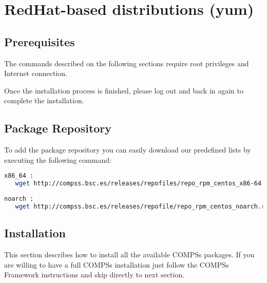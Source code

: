 \section{RedHat-based distributions (yum)}
\label{sec:RedHat_yum}


\subsection{Prerequisites}
The commands described on the following sections require root privileges and Internet connection.

Once the installation process is finished, please log out and back in again to complete the installation. 

\subsection{Package Repository}
To add the package repository you can easily download our predefined lists by executing the following command:
\begin{lstlisting}[language=bash]
x86_64 :  
   wget http://compss.bsc.es/releases/repofiles/repo_rpm_centos_x86-64.repo -O /etc/yum.repos.d/compss-framework_x86-64.repo
   
noarch :
   wget http://compss.bsc.es/releases/repofile/repo_rpm_centos_noarch.repo -O /etc/yum.repos.d/compss-framework_noarch.repo
\end{lstlisting}


\subsection{Installation}
This section describes how to install all the available COMPSs packages. If you are willing to have a full COMPSs installation 
just follow the COMPSs Framework instructions and skip directly to next section.

